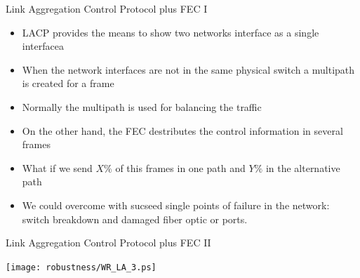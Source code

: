 \documentclass[compress,red]{beamer}
\begin{document}
\begin{frame}{Link Aggregation Control Protocol plus FEC I}

\begin{itemize}
    \item LACP provides the means to show two networks interface as a single  interfacea
    \item When the network interfaces are not in the same physical switch a  multipath is created for a frame
    \item Normally the multipath is used for balancing the traffic
    \item On the other hand, the FEC destributes the control information in several frames
    \item What if we send $X\%$ of this frames in one path and $Y\%$ in the alternative path
    \item We could overcome with sucseed single points of failure in the network: switch breakdown and damaged fiber optic or ports.
\end{itemize}
\end{frame}

\begin{frame}{Link Aggregation Control Protocol plus FEC II}

      \begin{center}
	        \texttt{[image: robustness/WR\_LA\_3.ps]}
      \end{center}
\end{frame}
\end{document}
